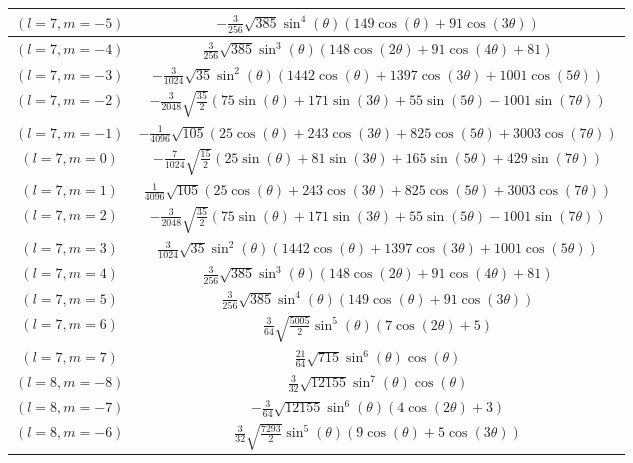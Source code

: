 \begin{center}
\begin{longtable}{|c|c|}
\rowcolor{gray!15}
$(l=7, m=-5)$ & $-\frac{3}{256} \sqrt{385} \sin ^4(\theta ) (149 \cos (\theta )+91 \cos (3 \theta ))$ \\ \hline
$(l=7, m=-4)$ & $\frac{3}{256} \sqrt{385} \sin ^3(\theta ) (148 \cos (2 \theta )+91 \cos (4 \theta )+81)$ \\ \hline
\rowcolor{gray!15}
$(l=7, m=-3)$ & $-\frac{3}{1024} \sqrt{35} \sin ^2(\theta ) (1442 \cos (\theta )+1397 \cos (3 \theta )+1001 \cos (5 \theta ))$ \\ \hline
$(l=7, m=-2)$ & $-\frac{3}{2048} \sqrt{\frac{35}{2}} (75 \sin (\theta )+171 \sin (3 \theta )+55 \sin (5 \theta )-1001 \sin (7 \theta ))$ \\ \hline
\rowcolor{gray!15}
$(l=7, m=-1)$ & $-\frac{1}{4096} \sqrt{105} (25 \cos (\theta )+243 \cos (3 \theta )+825 \cos (5 \theta )+3003 \cos (7 \theta ))$ \\ \hline
$(l=7, m=0)$ & $-\frac{7}{1024} \sqrt{\frac{15}{2}} (25 \sin (\theta )+81 \sin (3 \theta )+165 \sin (5 \theta )+429 \sin (7 \theta ))$ \\ \hline
\rowcolor{gray!15}
$(l=7, m=1)$ & $\frac{1}{4096} \sqrt{105} (25 \cos (\theta )+243 \cos (3 \theta )+825 \cos (5 \theta )+3003 \cos (7 \theta ))$ \\ \hline
$(l=7, m=2)$ & $-\frac{3}{2048} \sqrt{\frac{35}{2}} (75 \sin (\theta )+171 \sin (3 \theta )+55 \sin (5 \theta )-1001 \sin (7 \theta ))$ \\ \hline
\rowcolor{gray!15}
$(l=7, m=3)$ & $\frac{3}{1024} \sqrt{35} \sin ^2(\theta ) (1442 \cos (\theta )+1397 \cos (3 \theta )+1001 \cos (5 \theta ))$ \\ \hline
$(l=7, m=4)$ & $\frac{3}{256} \sqrt{385} \sin ^3(\theta ) (148 \cos (2 \theta )+91 \cos (4 \theta )+81)$ \\ \hline
\rowcolor{gray!15}
$(l=7, m=5)$ & $\frac{3}{256} \sqrt{385} \sin ^4(\theta ) (149 \cos (\theta )+91 \cos (3 \theta ))$ \\ \hline
$(l=7, m=6)$ & $\frac{3}{64} \sqrt{\frac{5005}{2}} \sin ^5(\theta ) (7 \cos (2 \theta )+5)$ \\ \hline
\rowcolor{gray!15}
$(l=7, m=7)$ & $\frac{21}{64} \sqrt{715} \sin ^6(\theta ) \cos (\theta )$ \\ \hline
$(l=8, m=-8)$ & $\frac{3}{32} \sqrt{12155} \sin ^7(\theta ) \cos (\theta )$ \\ \hline
\rowcolor{gray!15}
$(l=8, m=-7)$ & $-\frac{3}{64} \sqrt{12155} \sin ^6(\theta ) (4 \cos (2 \theta )+3)$ \\ \hline
$(l=8, m=-6)$ & $\frac{3}{32} \sqrt{\frac{7293}{2}} \sin ^5(\theta ) (9 \cos (\theta )+5 \cos (3 \theta ))$ \\ \hline

\end{longtable}
\end{center}
